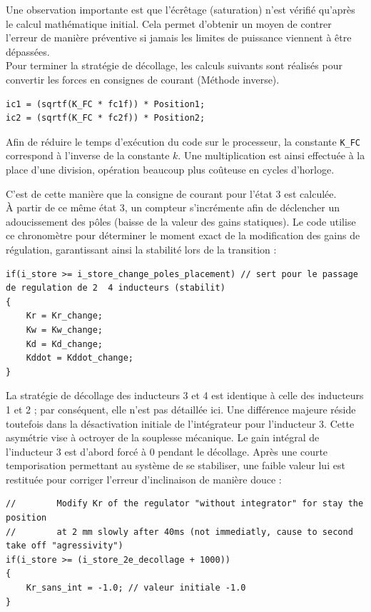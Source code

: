 Une observation importante est que l'écrêtage (saturation) n'est vérifié qu'après le calcul mathématique initial. Cela permet d'obtenir un moyen de contrer l'erreur de manière préventive si jamais les limites de puissance viennent à être dépassées.\\

Pour terminer la stratégie de décollage, les calculs suivants sont réalisés pour convertir les forces en consignes de courant (Méthode inverse).

\begin{verbatim}
ic1 = (sqrtf(K_FC * fc1f)) * Position1;
ic2 = (sqrtf(K_FC * fc2f)) * Position2;
\end{verbatim}

Afin de réduire le temps d'exécution du code sur le processeur, la constante \texttt{K\_FC} correspond à l'inverse de la constante $k$. Une multiplication est ainsi effectuée à la place d'une division, opération beaucoup plus coûteuse en cycles d'horloge.

C'est de cette manière que la consigne de courant pour l'état 3 est calculée.\\

À partir de ce même état 3, un compteur s'incrémente afin de déclencher un adoucissement des pôles (baisse de la valeur des gains statiques). Le code utilise ce chronomètre pour déterminer le moment exact de la modification des gains de régulation, garantissant ainsi la stabilité lors de la transition :

\begin{verbatim}
if(i_store >= i_store_change_poles_placement) // sert pour le passage de regulation de 2  4 inducteurs (stabilit)
{
    Kr = Kr_change;
    Kw = Kw_change;
    Kd = Kd_change;
    Kddot = Kddot_change;
}
\end{verbatim}

La stratégie de décollage des inducteurs 3 et 4 est identique à celle des inducteurs 1 et 2 ; par conséquent, elle n'est pas détaillée ici. Une différence majeure réside toutefois dans la désactivation initiale de l'intégrateur pour l'inducteur 3. Cette asymétrie vise à octroyer de la souplesse mécanique. Le gain intégral de l'inducteur 3 est d'abord forcé à 0 pendant le décollage. Après une courte temporisation permettant au système de se stabiliser, une faible valeur lui est restituée pour corriger l'erreur d'inclinaison de manière douce :

\begin{verbatim}
//        Modify Kr of the regulator "without integrator" for stay the position
//        at 2 mm slowly after 40ms (not immediatly, cause to second take off "agressivity")
if(i_store >= (i_store_2e_decollage + 1000))
{
    Kr_sans_int = -1.0; // valeur initiale -1.0
}
\end{verbatim}

